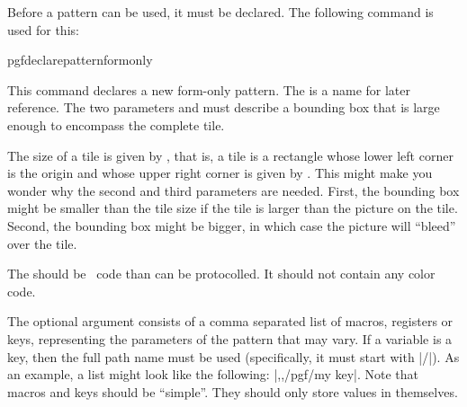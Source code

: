 Before a pattern can be used, it must be declared. The following
command is used for this:

\begin{docCommand}{pgfdeclarepatternformonly}{%
	}

	This command declares a new form-only pattern. The  is a
  name for later reference. The two parameters  and
   must describe a bounding box that is large enough
  to encompass the complete tile.
\end{docCommand}

  The size of a tile is given by , that is, a tile is
  a rectangle whose lower left   corner is the origin and whose upper
  right corner is given by . This might make you
  wonder why the second and third parameters are needed. First, the
  bounding box might be smaller than the tile size if the tile is
  larger than the picture on the tile. Second, the bounding box might
  be bigger, in which case the picture will ``bleed'' over the tile.

  The  should be \pgfname\ code than can be protocolled. It
  should not contain any color code.


\begin{codeexample}[]
{\pgfpointorigin}{\pgfpoint{1cm}{1cm}}
{\pgfpoint{1cm}{1cm}}
{
  \pgftransformshift{\pgfpoint{.5cm}{.5cm}}
  \pgfpathclose%
}
\end{codeexample}

	The optional argument  consists of a comma
	separated	list of macros,	registers or keys, representing the
	parameters of the pattern that may vary. If a variable is a key,
	then the full path name must be used (specifically, it must start
	with |/|).
	As an example, a list might look like the following:
	|\mymacro,\mydimen,/pgf/my key|. Note that macros and keys should
	be ``simple''. They should only store values in themselves.
	

